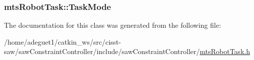\hypertarget{classmts_robot_task_ac3cc9bd3a27954263574d01325a6439b}{
\subsubsection[{Task\-Mode}]{ mts\-Robot\-Task\-::\-Task\-Mode\hspace{0.3cm}{\ttfamily [protected]}}}\label{classmts_robot_task_ac3cc9bd3a27954263574d01325a6439b}


The documentation for this class was generated from the following file\-:\begin{DoxyCompactItemize}
\item 
/home/adeguet1/catkin\-\_\-ws/src/cisst-\/saw/saw\-Constraint\-Controller/include/saw\-Constraint\-Controller/\hyperlink{mts_robot_task_8h}{mts\-Robot\-Task.\-h}\end{DoxyCompactItemize}
